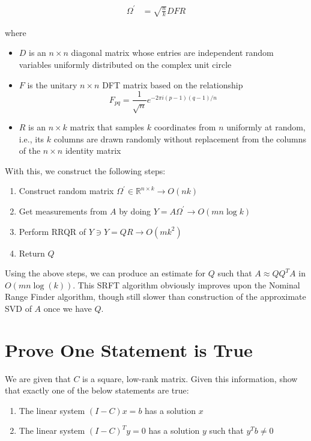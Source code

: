 \documentclass{article}[11pt]
\begin{document}
   \begin{align*}
   \Omega^{'} &= \sqrt{\frac{n}{k}} D F R
   \end{align*}
   
   where 
   
   \begin{itemize}
   \item $D$ is an $n \times n$ diagonal matrix whose entries are independent random variables uniformly distributed on the complex unit circle
   \item $F$ is the unitary $n \times n$ DFT matrix based on the relationship \\ $$F_{pq} = \frac{1}{\sqrt{n}} e^{-2\pi i (p-1) (q-1) / n}$$
   \item $R$ is an $n\times k$ matrix that samples $k$ coordinates from $n$ uniformly at random, i.e., its $k$ columns are drawn randomly without replacement from the columns of the $n\times n$ identity matrix
   \end{itemize}
   
   With this, we construct the following steps:
   
   \begin{enumerate}
   \item Construct random matrix $\Omega^{'} \in \mathbb{R}^{n \times k} \rightarrow O(nk)$
   \item Get measurements from $A$ by doing $Y = A\Omega^{'} \rightarrow O(mn \log{k} )$
   \item Perform RRQR of $Y \ni Y = QR \rightarrow O(mk^2)$
   \item Return $Q$
   \end{enumerate}
   
   Using the above steps, we can produce an estimate for $Q$ such that $A \approx QQ^TA$ in $O(m n \log(k))$. This SRFT algorithm obviously improves upon the Nominal Range Finder algorithm, though still slower than construction of the approximate SVD of $A$ once we have $Q$.
   
   \newpage
   \section{Prove One Statement is True}
   We are given that $C$ is a square, low-rank matrix. Given this information, show that exactly one of the below statements are true:
   
   \begin{enumerate}[label=(\Alph*)]
   \item The linear system $(I-C)x = b$ has a solution $x$
   \item The linear system $(I-C)^Ty = 0$ has a solution $y$ such that $y^Tb \neq 0$
   \end{enumerate}
   
\end{document}
